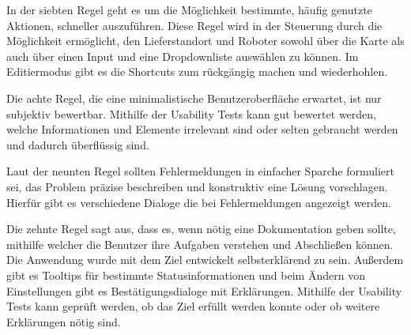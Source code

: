 In der siebten Regel geht es um die Möglichkeit bestimmte, häufig genutzte Aktionen, schneller auszuführen. Diese Regel wird in der Steuerung durch die Möglichkeit ermöglicht, den Lieferstandort und Roboter sowohl über die Karte als auch über einen Input und eine Dropdownliste auswählen zu können. Im Editiermodus gibt es die Shortcuts zum rückgängig machen und wiederhohlen.

Die achte Regel, die eine minimalistische Benutzeroberfläche erwartet, ist nur subjektiv bewertbar. Mithilfe der Usability Tests kann gut bewertet werden, welche Informationen und Elemente irrelevant sind oder selten gebraucht werden und dadurch überflüssig sind.

Laut der neunten Regel sollten Fehlermeldungen in einfacher Sparche formuliert sei, das Problem präzise beschreiben und konstruktiv eine Lösung vorschlagen. Hierfür gibt es verschiedene Dialoge die bei Fehlermeldungen angezeigt werden.

Die zehnte Regel sagt aus, dass es, wenn nötig eine Dokumentation geben sollte, mithilfe welcher die Benutzer ihre Aufgaben verstehen und Abschließen können. Die Anwendung wurde mit dem Ziel entwickelt selbsterklärend zu sein. 
Außerdem gibt es Tooltips für bestimmte Statusinformationen und beim Ändern von Einstellungen gibt es Bestätigungsdialoge mit Erklärungen. Mithilfe der Usability Tests kann geprüft werden, ob das Ziel erfüllt werden konnte oder ob weitere Erklärungen nötig sind.

